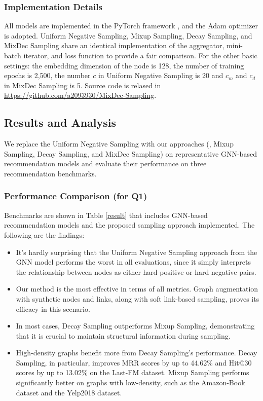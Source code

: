 \subsubsection{\textbf{Implementation Details}}
All models are implemented in the PyTorch framework \cite{paszke2019pytorch}, and the Adam optimizer\cite{kingma2014adam} is adopted. Uniform Negative Sampling\cite{negsamp}, Mixup Sampling, Decay Sampling, and MixDec Sampling share an identical implementation of the aggregator, mini-batch iterator, and loss function to provide a fair comparison. For the other basic settings: the embedding dimension of the node is 128, the number of training epochs is 2,500, the number $c$ in Uniform Negative Sampling is 20 and $c_m$ and $c_d$ in MixDec Sampling is 5. Source code is relased in \url{ https://github.com/a2093930/MixDec-Sampling}.

\subsection{Results and Analysis}
We replace the Uniform Negative Sampling with our approaches (\ie, Mixup Sampling, Decay Sampling, and MixDec Sampling) on representative GNN-based recommendation models and evaluate their performance on three recommendation benchmarks.


\subsubsection{\textbf{Performance Comparison (for Q1)}} \label{Q1}
Benchmarks are shown in Table \ref{result} that includes GNN-based recommendation models and the proposed sampling approach implemented. The following are the findings:

\begin{itemize}
\item It's hardly surprising that the Uniform Negative Sampling approach from the GNN model performs the worst in all evaluations, since it simply interprets the relationship between nodes as either hard positive or hard negative pairs.
\item Our method is the most effective in terms of all metrics. Graph augmentation with synthetic nodes and links, along with soft link-based sampling, proves its efficacy in this scenario.
\item In most cases, Decay Sampling outperforms Mixup Sampling, demonstrating that it is crucial to maintain structural information during sampling.
\item High-density graphs benefit more from Decay Sampling's performance. Decay Sampling, in particular, improves MRR scores by up to 44.62\% and Hit@30 scores by up to 13.02\% on the Last-FM dataset. Mixup Sampling performs significantly better on graphs with low-density, such as the Amazon-Book dataset and the Yelp2018 dataset.
\end{itemize}

